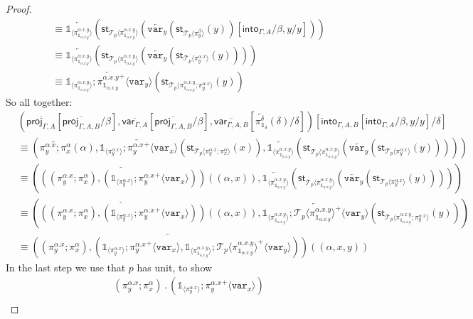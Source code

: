 \documentclass[10pt]{article}
\theoremstyle{definition}
\newcommand{\rewrite}[2]{\overleftarrow{#1}(#2)}
\newcommand\StI[2]{\ensuremath{\mathsf{st}_{#1}(#2)}}
\newcommand\ApEl[2]{\mathcal{T}_{#1}\langle#2\rangle}
\newcommand\bdot[0]{\mathbin{.}}
\newcommand\ApPlus[2]{\ensuremath{{#1}^+ \langle #2 \rangle }}
\newcommand{\upstairs}[1]{\overline{#1}}
\newcommand\proj[1]{\ensuremath{\mathsf{proj}_{#1}}}
\newcommand\qvar[1]{\ensuremath{\mathsf{var}_{#1}}}
\newcommand\into[1]{\ensuremath{\mathsf{into}_{#1}}}
\newcommand\One{\ensuremath{\mathds{1}}}
\newcommand\var[1]{\ensuremath{\mathtt{var}_{#1}}}
\newcommand\ApOne[1]{\ensuremath{\One_{\langle {#1} \rangle }}}
\begin{document}
\begin{proof}
\begin{align*}
&\equiv \rewrite{\ApOne{\pi^{\alpha.x.y}_{\One_{\alpha.x.y}}}}{\StI{\ApEl{p}{\pi^{\alpha.x.y}_{\One_{\alpha.x.y}}}}{\rewrite{\var{y}}{\StI{\ApEl{p}{\pi^{\beta}_y}}{y}}[\into{\Gamma, A}/\beta, y/y]}} \\
&\equiv \rewrite{\ApOne{\pi^{\alpha.x.y}_{\One_{\alpha.x.y}}}}{\StI{\ApEl{p}{\pi^{\alpha.x.y}_{\One_{\alpha.x.y}}}}{\rewrite{\var{y}}{\StI{\ApEl{p}{\pi^{\alpha.x}_y}}{y}}}} \\
&\equiv \rewrite{\ApOne{\pi^{\alpha.x.y}_{\One_{\alpha.x.y}}};\ApPlus{\pi^{\alpha.x.y}_{\One_{\alpha.x.y}}}{\var{y}}}{\StI{\ApEl{p}{\pi^{\alpha.x.y}_{\One_{\alpha.x.y}};\pi^{\alpha.x}_y}}{y}}
\end{align*}
So all together:
\begin{align*}
&(\upstairs{\proj{\Gamma, A}}[\upstairs{\proj{\Gamma, A, B}}/\beta], \upstairs{\qvar{\Gamma, A}}[\upstairs{\proj{\Gamma, A, B}}/\beta], \upstairs{\qvar{\Gamma, A, B}}[\rewrite{\pi^\delta_{\One_\delta}}{\delta}/\delta])[\into{\Gamma, A, B}[\into{\Gamma, A}/\beta, y/y]/\delta] \\
&\equiv (\rewrite{\pi^{\alpha.x}_y;\pi^\alpha_x}{\alpha}, \rewrite{\ApOne{\pi^{\alpha.x}_y};\ApPlus{\pi^{\alpha.x}_y}{\var{x}}}{\StI{\ApEl{p}{\pi^{\alpha.x}_y;\pi^{\alpha}_x}}{x}}, \rewrite{\ApOne{\pi^{\alpha.x.y}_{\One_{\alpha.x.y}}}}{\StI{\ApEl{p}{\pi^{\alpha.x.y}_{\One_{\alpha.x.y}}}}{\rewrite{\var{y}}{\StI{\ApEl{p}{\pi^{\alpha.x}_y}}{y}}}}) \\
&\equiv (\rewrite{((\pi^{\alpha.x}_y;\pi^\alpha_x), (\ApOne{\pi^{\alpha.x}_y};\ApPlus{\pi^{\alpha.x}_y}{\var{x}}))}{(\alpha, x)}, \rewrite{\ApOne{\pi^{\alpha.x.y}_{\One_{\alpha.x.y}}}}{\StI{\ApEl{p}{\pi^{\alpha.x.y}_{\One_{\alpha.x.y}}}}{\rewrite{\var{y}}{\StI{\ApEl{p}{\pi^{\alpha.x}_y}}{y}}}}) \\
&\equiv (\rewrite{((\pi^{\alpha.x}_y;\pi^\alpha_x), (\ApOne{\pi^{\alpha.x}_y};\ApPlus{\pi^{\alpha.x}_y}{\var{x}}))}{(\alpha, x)}, \rewrite{\ApOne{\pi^{\alpha.x.y}_{\One_{\alpha.x.y}}};\ApPlus{\ApEl{p}{\pi^{\alpha.x.y}_{\One_{\alpha.x.y}}}}{\var{y}}}{\StI{\ApEl{p}{\pi^{\alpha.x.y}_{\One_{\alpha.x.y}};\pi^{\alpha.x}_y}}{y}}) \\
&\equiv \rewrite{((\pi^{\alpha.x}_y;\pi^\alpha_x), (\ApOne{\pi^{\alpha.x}_y};\ApPlus{\pi^{\alpha.x}_y}{\var{x}}, \ApOne{\pi^{\alpha.x.y}_{\One_{\alpha.x.y}}};\ApPlus{\ApEl{p}{\pi^{\alpha.x.y}_{\One_{\alpha.x.y}}}}{\var{y}}))}{(\alpha, x,y)}
\end{align*}
In the last step we use that $p$ has unit, to show
\begin{align*}
&(\pi^{\alpha.x}_y;\pi^\alpha_x) \bdot (\ApOne{\pi^{\alpha.x}_y};\ApPlus{\pi^{\alpha.x}_y}{\var{x}}) \\

\end{align*}
\end{proof}
\end{document}
